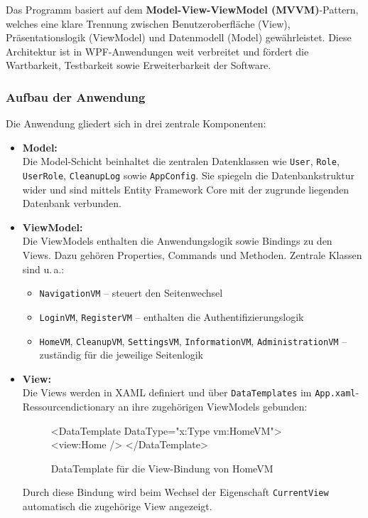 
Das Programm basiert auf dem \textbf{Model-View-ViewModel (MVVM)}-Pattern, welches eine klare Trennung zwischen Benutzeroberfläche (View), Präsentationslogik (ViewModel) und Datenmodell (Model) gewährleistet. Diese Architektur ist in WPF-Anwendungen weit verbreitet und fördert die Wartbarkeit, Testbarkeit sowie Erweiterbarkeit der Software.

\subsubsection*{Aufbau der Anwendung}

Die Anwendung gliedert sich in drei zentrale Komponenten:

\begin{itemize}
    \item \textbf{Model:} \\
    Die Model-Schicht beinhaltet die zentralen Datenklassen wie \texttt{User}, \texttt{Role}, \texttt{UserRole}, \texttt{CleanupLog} sowie \texttt{AppConfig}. Sie spiegeln die Datenbankstruktur wider und sind mittels Entity Framework Core mit der zugrunde liegenden Datenbank verbunden.
    
    \item \textbf{ViewModel:} \\
    Die ViewModels enthalten die Anwendungslogik sowie Bindings zu den Views. Dazu gehören Properties, Commands und Methoden. Zentrale Klassen sind u.\,a.:
    \begin{itemize}
        \item \texttt{NavigationVM} – steuert den Seitenwechsel
        \item \texttt{LoginVM}, \texttt{RegisterVM} – enthalten die Authentifizierungslogik
        \item \texttt{HomeVM}, \texttt{CleanupVM}, \texttt{SettingsVM}, \texttt{InformationVM}, \texttt{AdministrationVM} – zuständig für die jeweilige Seitenlogik
    \end{itemize}
    
    \item \textbf{View:} \\
    Die Views werden in XAML definiert und über \texttt{DataTemplates} im \texttt{App.xaml}-Ressourcendictionary an ihre zugehörigen ViewModels gebunden:

\begin{figure}[H]
    \centering
    \begin{xamlcode}
<DataTemplate DataType="{x:Type vm:HomeVM}">
    <view:Home />
</DataTemplate>
\end{xamlcode}
    \caption{DataTemplate für die View-Bindung von HomeVM}
\end{figure}

    Durch diese Bindung wird beim Wechsel der Eigenschaft \texttt{CurrentView} automatisch die zugehörige View angezeigt.
\end{itemize}

